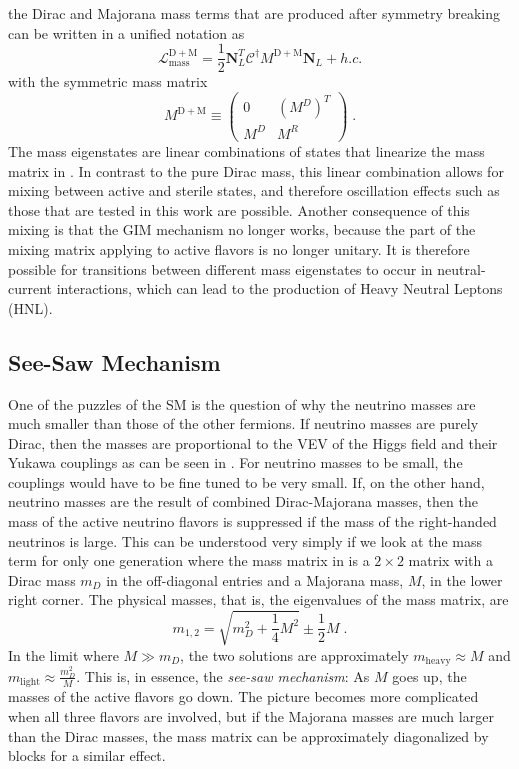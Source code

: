 the Dirac and Majorana mass terms that are produced after symmetry breaking can be written in a unified notation as
\begin{equation}
  \mathcal{L}_\mathrm{mass}^\mathrm{D+M} = \frac{1}{2} \boldsymbol{N}_L^T \mathcal{C}^\dag M^\mathrm{D+M} \boldsymbol{N}_L + h.c.
\end{equation}
with the symmetric mass matrix
\begin{equation}
  M^\mathrm{D+M} \equiv
  \begin{pmatrix}
  0 & (M^D)^T \\
  M^D & M^R
  \end{pmatrix}\;.\label{eq:dm-mass-matrix}
\end{equation}
The mass eigenstates are linear combinations of states that linearize the mass matrix in . In contrast to the pure Dirac mass, this linear combination allows for mixing between active and sterile states, and therefore oscillation effects such as those that are tested in this work are possible. Another consequence of this mixing is that the GIM mechanism no longer works, because the part of the mixing matrix applying to active flavors is no longer unitary. It is therefore possible for transitions between different mass eigenstates to occur in neutral-current interactions, which can lead to the production of Heavy Neutral Leptons (HNL).

\subsection{See-Saw Mechanism}

One of the puzzles of the SM is the question of why the neutrino masses are much smaller than those of the other fermions. If neutrino masses are purely Dirac, then the masses are proportional to the VEV of the Higgs field and their Yukawa couplings as can be seen in . For neutrino masses to be small, the couplings would have to be fine tuned to be very small. If, on the other hand, neutrino masses are the result of combined Dirac-Majorana masses, then the mass of the active neutrino flavors is suppressed if the mass of the right-handed neutrinos is large. This can be understood very simply if we look at the mass term for only one generation where the mass matrix in  is a $2\times2$ matrix with a Dirac mass $m_D$ in the off-diagonal entries and a Majorana mass, $M$, in the lower right corner. The physical masses, that is, the eigenvalues of the mass matrix, are
\begin{equation}
    m_{1,2} = \sqrt{m_D^2 + \frac{1}{4}M^2} \pm \frac{1}{2} M\;.
\end{equation}
In the limit where $M \gg m_D$, the two solutions are approximately $m_\mathrm{heavy} \approx M$ and $m_\mathrm{light} \approx \frac{m_D^2}{M}$. This is, in essence, the \emph{see-saw mechanism}: As $M$ goes up, the masses of the active flavors go down. The picture becomes more complicated when all three flavors are involved, but if the Majorana masses are much larger than the Dirac masses, the mass matrix can be approximately diagonalized by blocks for a similar effect.


